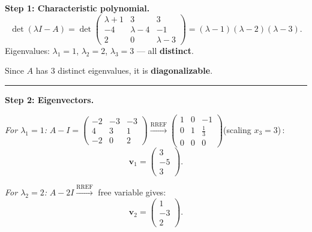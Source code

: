 \documentclass[12pt,a3paper]{article}
\begin{document}
\begin{tcolorbox}[enhanced,breakable,
  colback=cE!4,colframe=cE,boxrule=0.8pt,arc=5pt,
  title={\textbf{Answer --- Diagonalizability \& $A^{21}$ for
    $A=\begin{pmatrix}-1&-3&-3\\4&4&1\\-2&0&3\end{pmatrix}$}},
  fonttitle=\bfseries\color{white},colbacktitle=cE]
 
\textbf{Step 1: Characteristic polynomial.}
\[
  \det(\lambda I - A)
  = \det\begin{pmatrix}\lambda+1&3&3\\-4&\lambda-4&-1\\2&0&\lambda-3\end{pmatrix}
  = (\lambda-1)(\lambda-2)(\lambda-3).
\]
Eigenvalues: $\lambda_1 = 1$, $\lambda_2 = 2$, $\lambda_3 = 3$ — all \textbf{distinct}.
 
Since $A$ has 3 distinct eigenvalues, it is \textbf{diagonalizable}. \checkmark
 
\medskip\textcolor{cE}{\rule{\textwidth}{0.4pt}}
 
\textbf{Step 2: Eigenvectors.}
 
\textit{For $\lambda_1 = 1$:} \;$A - I = \begin{pmatrix}-2&-3&-3\\4&3&1\\-2&0&2\end{pmatrix}
\xrightarrow{\text{RREF}} \begin{pmatrix}1&0&-1\\0&1&\frac{1}{3}\\0&0&0\end{pmatrix}$\quad (scaling $x_3=3$)\,:
\[
\mathbf{v}_1 = \begin{pmatrix}3\\-5\\3\end{pmatrix}.\]
 
\textit{For $\lambda_2 = 2$:} \;$A - 2I \xrightarrow{\text{RREF}}$ free variable gives:
\[
  \mathbf{v}_2 = \begin{pmatrix}1\\-3\\2\end{pmatrix}.
\]
 

\end{tcolorbox}
\end{document}

